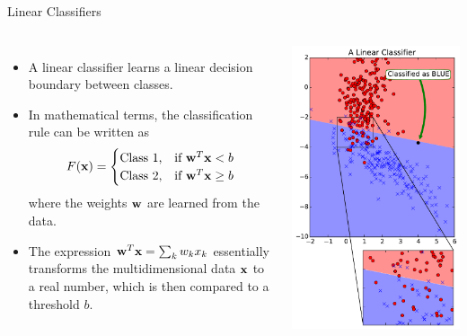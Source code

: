 \documentclass[10pt, aspectratio=169]{beamer} %
\newcommand{\w}{{\bf w}}
\newcommand{\x}{{\bf x}}
\begin{document}
\begin{frame}{Linear Classifiers}
\begin{columns}
\begin{itemize}
\item A linear classifier learns a linear decision boundary between classes.
\item In mathematical terms, the classification rule can be written as
\[
F(\x) = \begin{cases}
\text{Class 1,} & \text{if } \w^T\x < b\\
\text{Class 2,} & \text{if } \w^T\x \geq b
\end{cases}
\]
where the weights $\w$ are learned from the data.
\item The expression $\w^T\x = \sum_k w_kx_k$ essentially transforms the 
multi\-dimensional data $\x$ to a real number, which is then compared to a threshold $b$.
\end{itemize}
\centerline{\includegraphics[width=\columnwidth]{Linear.pdf}}
\end{columns}
\end{frame}
\end{document}
